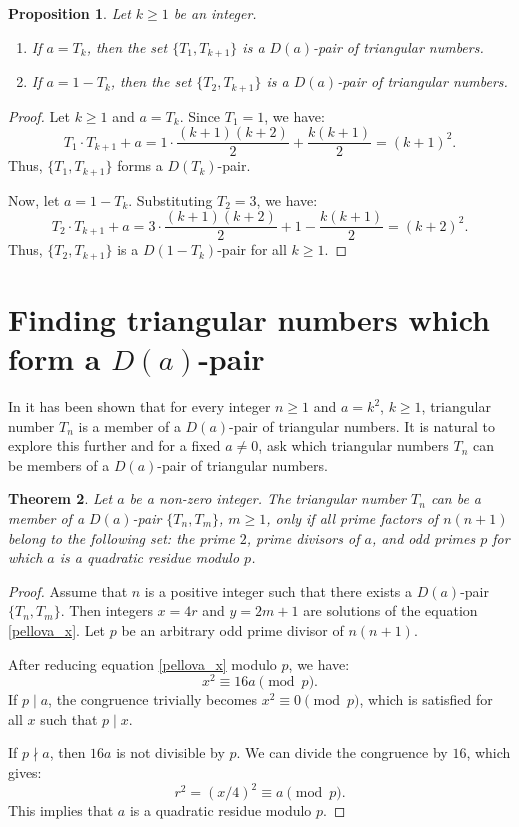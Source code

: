 \documentclass[12pt]{amsart}
\newtheorem{theorem}{Theorem}
\newtheorem{proposition}[theorem]{Proposition}
\theoremstyle{definition}
\begin{document}
\begin{proposition} \label{prop:a_is_triangular}
Let $k \ge 1$ be an integer.
\begin{enumerate}
    \item If $a = T_k$, then the set $\{T_1, T_{k+1}\}$ is a $D(a)$-pair of triangular numbers.
    \item If $a = 1 - T_k$, then the set $\{T_2, T_{k+1}\}$ is a $D(a)$-pair of triangular numbers.
\end{enumerate}
\end{proposition}
\begin{proof}
Let $k\geq 1$ and $a = T_k$. Since $T_1 = 1$, we have:
$$
T_1 \cdot T_{k+1} + a = 1 \cdot \frac{(k+1)(k+2)}{2} + \frac{k(k+1)}{2}= (k+1)^2. 
$$
Thus, $\{T_1, T_{k+1}\}$ forms a $D(T_k)$-pair.

Now, let $a = 1 - T_k$. Substituting $T_2 = 3$, we have:
$$ T_2 \cdot T_{k+1} + a = 3 \cdot \frac{(k+1)(k+2)}{2} + 1 - \frac{k(k+1)}{2}=(k+2)^2. $$
Thus, $\{T_2, T_{k+1}\}$ is a $D(1 - T_k)$-pair for all $k \ge 1$.
\end{proof}

\section{Finding triangular numbers which form a $D(a)$-pair}\label{section:member_pairs}

In \cite{mbt_triangular} it has been shown that for every integer $n\geq 1$ and $a=k^2$, $k\geq 1$, triangular number $T_n$ is a member of a $D(a)$-pair of triangular numbers. It is natural to explore this further and for a fixed $a\neq0$, ask which triangular numbers $T_n$ can be members of a $D(a)$-pair of triangular numbers.

\begin{theorem} \label{thm:generalized}
Let $a$ be a non-zero integer. The triangular number $T_n$ can be a member of a $D(a)$-pair $\{T_n,T_m\}$, $m\geq 1$, only if all prime factors of $n(n+1)$ belong to the following set: the prime $2$, prime divisors of $a$, and odd primes $p$ for which $a$ is a quadratic residue modulo $p$. 
\end{theorem}
\begin{proof}
Assume that $n$ is a positive integer such that there exists a $D(a)$-pair $\{T_n,T_m\}$. Then   integers $x=4r$ and $y=2m+1$ are solutions of the equation \eqref{pellova_x}. Let $p$ be an arbitrary odd prime divisor of $n(n+1)$. 

After reducing equation \eqref{pellova_x} modulo $p$, we have:
$$ x^2 \equiv 16a \pmod p. $$
If $p \mid a$, the congruence trivially becomes $x^2 \equiv 0 \pmod p$, which is satisfied for all $x$ such that $p \mid x$. 

If $p \nmid a$, then $16a$ is not divisible by $p$. We can divide the congruence by $16$, which gives:
$$ r^2=(x/ 4)^2 \equiv a \pmod p. $$
This implies that $a$ is a quadratic residue modulo $p$. 
\end{proof}
\end{document}
